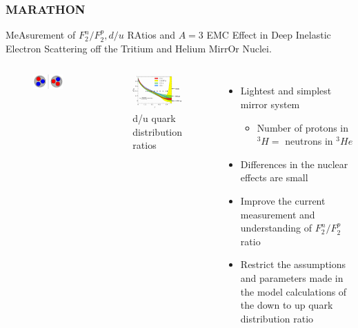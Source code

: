 \documentclass{beamer}
\begin{document}
\begin{frame}
\frametitle{MARATHON}
MeAsurement of $F^n_2/F^p_2, d/u$ RAtios and $A=3$ EMC Effect in Deep Inelastic Electron Scattering off the Tritium and Helium MirrOr Nuclei.
\vspace{-10pt}
\begin{columns}[t]
	
	
	\begin{figure}
		\includegraphics[width =5cm]{../images/mirror}
	\end{figure}
	\vspace{-25pt}
	\begin{figure}
		\includegraphics[width=5cm]{../images/d_u}
		\caption{d/u quark distribution ratios}
	\end{figure}
	
	\begin{itemize}
		\item Lightest and simplest mirror system
		\begin{itemize}
			\item  Number of protons in $^3H =$ neutrons in $^3He$
		\end{itemize}
		\item Differences in the nuclear effects are small
		\item Improve the current measurement and understanding of $F^n_2/F^p_2$ ratio
		\item Restrict the assumptions and parameters made in the model calculations of the down to up quark distribution ratio
	\end{itemize}
	
	
\end{columns}
\end{frame}
\end{document}
